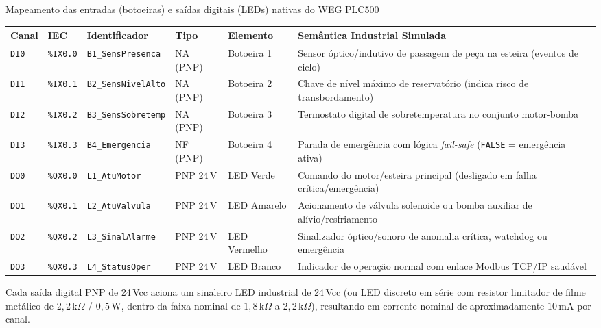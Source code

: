 \begin{quadro}[htb]
  \centering
  \SingleSpacing
  \caption{Mapeamento das entradas (botoeiras) e saídas digitais (LEDs) nativas do WEG PLC500}
  \label{quadro:mapeamento_io}
  \footnotesize
  \begin{tabularx}{\textwidth}{|p{1.05cm}|p{1.2cm}|p{3.0cm}|p{1.25cm}|p{1.7cm}|L|}
    \hline
    \textbf{Canal} & \textbf{IEC} & \textbf{Identificador} & \textbf{Tipo} & \textbf{Elemento} & \textbf{Semântica Industrial Simulada} \\
    \hline
    \texttt{DI0} & \texttt{\%IX0.0} & \texttt{B1\_SensPresenca} & NA (PNP) & Botoeira 1 & Sensor óptico/indutivo de passagem de peça na esteira (eventos de ciclo) \\
    \hline
    \texttt{DI1} & \texttt{\%IX0.1} & \texttt{B2\_SensNivelAlto} & NA (PNP) & Botoeira 2 & Chave de nível máximo de reservatório (indica risco de transbordamento) \\
    \hline
    \texttt{DI2} & \texttt{\%IX0.2} & \texttt{B3\_SensSobretemp} & NA (PNP) & Botoeira 3 & Termostato digital de sobretemperatura no conjunto motor-bomba \\
    \hline
    \texttt{DI3} & \texttt{\%IX0.3} & \texttt{B4\_Emergencia} & NF (PNP) & Botoeira 4 & Parada de emergência com lógica \textit{fail-safe} (\texttt{FALSE} = emergência ativa) \\
    \hline
    \texttt{DO0} & \texttt{\%QX0.0} & \texttt{L1\_AtuMotor} & PNP 24\,V & LED Verde & Comando do motor/esteira principal (desligado em falha crítica/emergência) \\
    \hline
    \texttt{DO1} & \texttt{\%QX0.1} & \texttt{L2\_AtuValvula} & PNP 24\,V & LED Amarelo & Acionamento de válvula solenoide ou bomba auxiliar de alívio/resfriamento \\
    \hline
    \texttt{DO2} & \texttt{\%QX0.2} & \texttt{L3\_SinalAlarme} & PNP 24\,V & LED Vermelho & Sinalizador óptico/sonoro de anomalia crítica, watchdog ou emergência \\
    \hline
    \texttt{DO3} & \texttt{\%QX0.3} & \texttt{L4\_StatusOper} & PNP 24\,V & LED Branco & Indicador de operação normal com enlace Modbus TCP/IP saudável \\
    \hline
  \end{tabularx}
\end{quadro}

Cada saída digital PNP de 24\,Vcc aciona um sinaleiro LED industrial de 24\,Vcc (ou LED discreto em série com resistor limitador de filme metálico de $2{,}2\,\text{k}\Omega$ / $0{,}5\,\text{W}$, dentro da faixa nominal de $1{,}8\,\text{k}\Omega$ a $2{,}2\,\text{k}\Omega$), resultando em corrente nominal de aproximadamente $10\,\text{mA}$ por canal.

